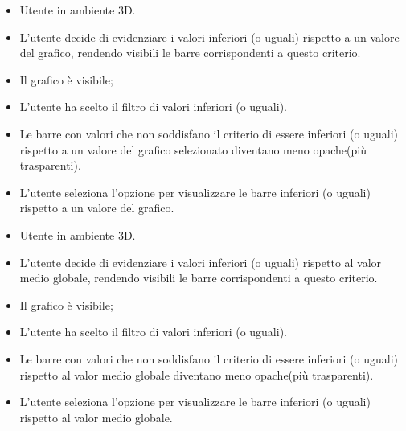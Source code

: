 \UCdsc
{ %
    \begin{itemize}
        \item Utente in ambiente 3D.
    \end{itemize}
}
{ %
    \begin{itemize}
        \item L'utente decide di evidenziare i valori inferiori (o uguali) rispetto a un valore del grafico, rendendo visibili le barre corrispondenti a questo criterio.
    \end{itemize}
}
{ %
    \begin{itemize}
        \item Il grafico è visibile;
        \item L'utente ha scelto il filtro di valori inferiori (o uguali).
    \end{itemize}
}
{ %
    \begin{itemize}
        \item Le barre con valori che non soddisfano il criterio di essere inferiori (o uguali) rispetto a un valore del grafico selezionato diventano meno opache(più trasparenti).
    \end{itemize}
}
{ %
    \begin{itemize}
        \item L'utente seleziona l'opzione per visualizzare le barre inferiori (o uguali) rispetto a un valore del grafico.
    \end{itemize}
}


\UCdsc
{ %
    \begin{itemize}
        \item Utente in ambiente 3D.
    \end{itemize}
}
{ %
    \begin{itemize}
        \item L'utente decide di evidenziare i valori inferiori (o uguali) rispetto al valor medio globale, rendendo visibili le barre corrispondenti a questo criterio.
    \end{itemize}
}
{ %
    \begin{itemize}
        \item Il grafico è visibile;
        \item L'utente ha scelto il filtro di valori inferiori (o uguali).
    \end{itemize}
}
{ %
    \begin{itemize}
        \item Le barre con valori che non soddisfano il criterio di essere inferiori (o uguali) rispetto al valor medio globale diventano meno opache(più trasparenti).
    \end{itemize}
}
{ %
    \begin{itemize}
        \item L'utente seleziona l'opzione per visualizzare le barre inferiori (o uguali) rispetto al valor medio globale.
    \end{itemize}
}





